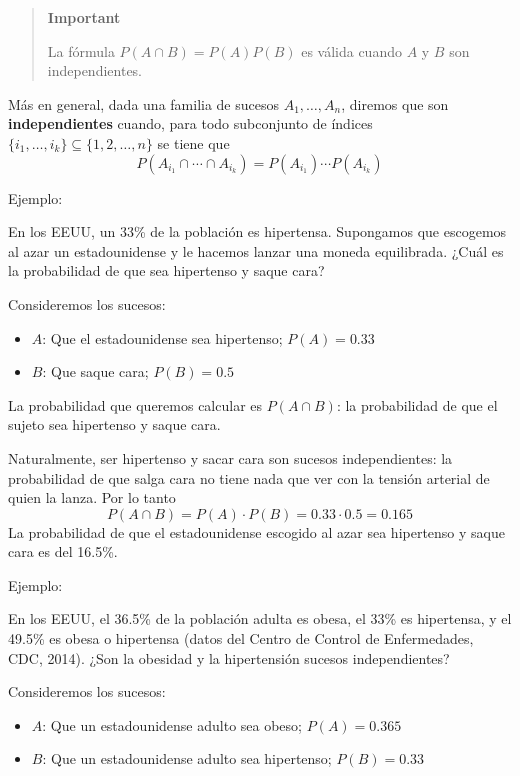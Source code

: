 \documentclass[
  spanish,
  letterpaper,
  DIV=11,
  numbers=noendperiod]{scrreprt}
\begin{document}
\begin{tcolorbox}
\begin{quote}
\textbf{Important}

La fórmula \(P(A\cap B)=P(A)P(B)\) es válida cuando \(A\) y \(B\) son
independientes.
\end{quote}

Más en general, dada una familia de sucesos \(A_1,\ldots,A_n\), diremos
que son \textbf{independientes} cuando, para todo subconjunto de índices
\(\{i_1,\ldots,i_k\}\subseteq \{1,2,\ldots,n\}\) se tiene que \[
P(A_{i_1}\cap\cdots \cap A_{i_k})=P(A_{i_1})\cdots P(A_{i_k})
\]

Ejemplo:

En los EEUU, un 33\% de la población es hipertensa. Supongamos que
escogemos al azar un estadounidense y le hacemos lanzar una moneda
equilibrada. ¿Cuál es la probabilidad de que sea hipertenso y saque
cara?

Consideremos los sucesos:

\begin{itemize}
\item
  \(A\): Que el estadounidense sea hipertenso; \(P(A)=0.33\)
\item
  \(B\): Que saque cara; \(P(B)=0.5\)
\end{itemize}

La probabilidad que queremos calcular es \(P(A\cap B)\): la probabilidad
de que el sujeto sea hipertenso y saque cara.

Naturalmente, ser hipertenso y sacar cara son sucesos independientes: la
probabilidad de que salga cara no tiene nada que ver con la tensión
arterial de quien la lanza. Por lo tanto \[
P(A\cap B)=P(A)\cdot P(B)=0.33\cdot 0.5=0.165
\] La probabilidad de que el estadounidense escogido al azar sea
hipertenso y saque cara es del 16.5\%.

Ejemplo:

En los EEUU, el 36.5\% de la población adulta es obesa, el 33\% es
hipertensa, y el 49.5\% es obesa o hipertensa (datos del Centro de
Control de Enfermedades, CDC, 2014). ¿Son la obesidad y la hipertensión
sucesos independientes?

Consideremos los sucesos:

\begin{itemize}
\item
  \(A\): Que un estadounidense adulto sea obeso; \(P(A)=0.365\)
\item
  \(B\): Que un estadounidense adulto sea hipertenso; \(P(B)=0.33\)
\end{itemize}


\end{tcolorbox}
\end{document}
